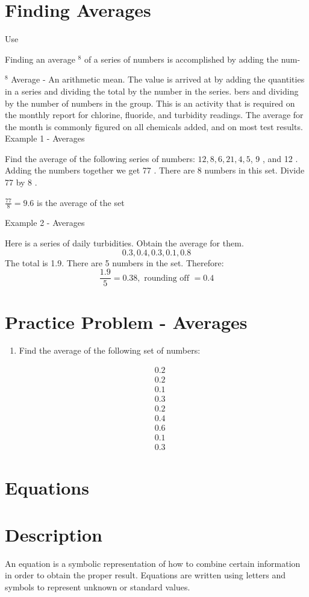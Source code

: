 \documentclass[10pt]{article}
\begin{document}
\section{Finding Averages}
Use

Finding an average $^{8}$ of a series of numbers is accomplished by adding the num-

${ }^{8}$ Average - An arithmetic mean. The value is arrived at by adding the quantities in a series and dividing the total by the number in the series. bers and dividing by the number of numbers in the group. This is an activity that is required on the monthly report for chlorine, fluoride, and turbidity readings. The average for the month is commonly figured on all chemicals added, and on most test results. Example 1 - Averages

Find the average of the following series of numbers: $12,8,6,21,4,5$, 9 , and 12 . Adding the numbers together we get 77 . There are 8 numbers in this set. Divide 77 by 8 .

$\frac{77}{8}=9.6$ is the average of the set

Example 2 - Averages

Here is a series of daily turbidities. Obtain the average for them.
$$
0.3,0.4,0.3,0.1,0.8
$$
The total is 1.9. There are 5 numbers in the set. Therefore:
$$
\frac{1.9}{5}=0.38, \text { rounding off }=0.4
$$

\section{Practice Problem - Averages}
\begin{enumerate}
  \item Find the average of the following set of numbers:
\end{enumerate}
$$
\begin{aligned}
&0.2 \\
&0.2 \\
&0.1 \\
&0.3 \\
&0.2 \\
&0.4 \\
&0.6 \\
&0.1 \\
&0.3
\end{aligned}
$$

\section{Equations}
\section{Description}
An equation is a symbolic representation of how to combine certain information in order to obtain the proper result. Equations are written using letters and symbols to represent unknown or standard values.
\end{document}
